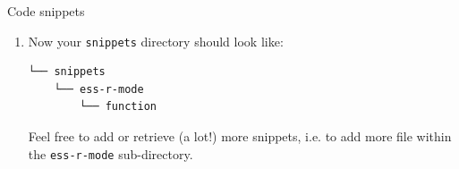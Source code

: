\documentclass[presentation]{beamer}
\begin{document}
\begin{frame}[fragile,allowframebreaks,label=]{Code snippets}
\begin{enumerate}
\item Now your \texttt{snippets} directory should look like:
\begin{verbatim}
└── snippets
    └── ess-r-mode
        └── function
\end{verbatim}

Feel free to add or retrieve (a lot!) more snippets, i.e. to add more file within the \texttt{ess-r-mode} sub-directory.
\end{enumerate}
\end{frame}
\end{document}
